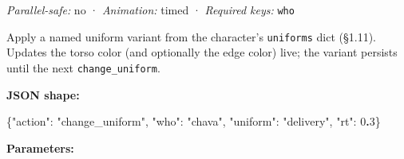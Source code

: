 \documentclass[
  11pt,
]{book}
\newenvironment{Shaded}{}{}
\newcommand{\DataTypeTok}[1]{\textcolor[rgb]{0.56,0.13,0.00}{#1}}
\newcommand{\DecValTok}[1]{\textcolor[rgb]{0.25,0.63,0.44}{#1}}
\newcommand{\ErrorTok}[1]{\textcolor[rgb]{1.00,0.00,0.00}{\textbf{#1}}}
\newcommand{\FunctionTok}[1]{\textcolor[rgb]{0.02,0.16,0.49}{#1}}
\newcommand{\StringTok}[1]{\textcolor[rgb]{0.25,0.44,0.63}{#1}}
\begin{document}
\emph{Parallel-safe:} no · \emph{Animation:} timed · \emph{Required
keys:} \texttt{who}

Apply a named uniform variant from the character's \texttt{uniforms}
dict (§1.11). Updates the torso color (and optionally the edge color)
live; the variant persists until the next \texttt{change\_uniform}.

\textbf{JSON shape:}

\begin{Shaded}
\begin{Highlighting}[]
\FunctionTok{\{}\DataTypeTok{"action"}\FunctionTok{:} \StringTok{"change\_uniform"}\FunctionTok{,} \DataTypeTok{"who"}\FunctionTok{:} \StringTok{"chava"}\FunctionTok{,} \DataTypeTok{"uniform"}\FunctionTok{:} \StringTok{"delivery"}\FunctionTok{,} \DataTypeTok{"rt"}\FunctionTok{:} \DecValTok{0}\ErrorTok{.}\DecValTok{3}\FunctionTok{\}}
\end{Highlighting}
\end{Shaded}

\textbf{Parameters:}
\end{document}
